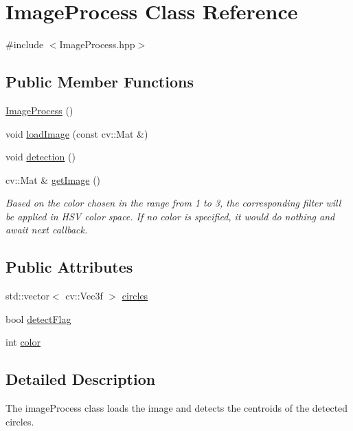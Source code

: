 \hypertarget{classImageProcess}{}\section{Image\+Process Class Reference}
\label{classImageProcess}


{\ttfamily \#include $<$Image\+Process.\+hpp$>$}

\subsection*{Public Member Functions}
\begin{DoxyCompactItemize}
\item 
\hyperlink{classImageProcess_a3dd8d2b73be1d21ccac33921defcf533}{Image\+Process} ()
\item 
void \hyperlink{classImageProcess_a4c08cfba39236fa09ec5f2d0e37452fb}{load\+Image} (const cv\+::\+Mat \&)
\item 
void \hyperlink{classImageProcess_a0a4d4d847095fa9632565ec68b746b4f}{detection} ()
\item 
cv\+::\+Mat \& \hyperlink{classImageProcess_a440fe5754a991d833ff63c28e6888efe}{get\+Image} ()
\begin{DoxyCompactList}\small\item\em Based on the color chosen in the range from 1 to 3, the corresponding filter will be applied in H\+SV color space. If no color is specified, it would do nothing and await next callback. \end{DoxyCompactList}\end{DoxyCompactItemize}
\subsection*{Public Attributes}
\begin{DoxyCompactItemize}
\item 
std\+::vector$<$ cv\+::\+Vec3f $>$ \hyperlink{classImageProcess_aafcbd180aa8e8dd937f736a43685a6bc}{circles}
\item 
bool \hyperlink{classImageProcess_a265b78fb51ab67a89743dd9c3f85e69b}{detect\+Flag}
\item 
int \hyperlink{classImageProcess_ab96f8c1ee03f6bbf8e60ffa496fdaa0d}{color}
\end{DoxyCompactItemize}


\subsection{Detailed Description}
The image\+Process class loads the image and detects the centroids of the detected circles. 

